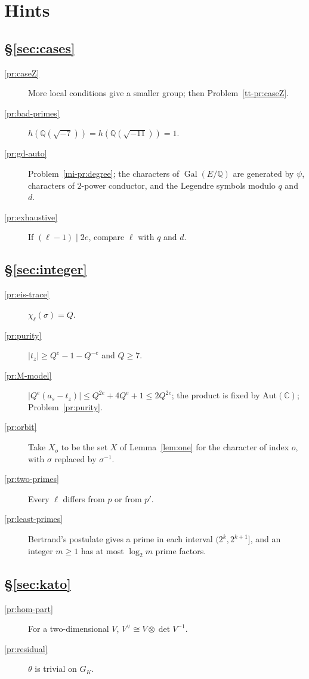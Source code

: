 \documentclass[reqno]{amsart}
\theoremstyle{definition}
\theoremstyle{plain}
\theoremstyle{remark}
\newcommand{\Q}{\mathbb{Q}}
\newcommand{\C}{\mathbb{C}}
\newcommand{\Gal}{\operatorname{Gal}}
\begin{document}
\section*{Hints}

\subsection*{\S\ref{sec:cases}}
\begin{description}
\item[\ref{pr:caseZ}] More local conditions give a smaller group; then Problem~\ref{tt-pr:caseZ}.
\item[\ref{pr:bad-primes}] \(h(\Q(\sqrt{-7}))=h(\Q(\sqrt{-11}))=1\).
\item[\ref{pr:gd-auto}] Problem~\ref{mi-pr:degree}; the characters of \(\Gal(E/\Q)\) are generated by \(\psi\), characters of \(2\)-power conductor, and the Legendre symbols modulo \(q\) and \(d\).
\item[\ref{pr:exhaustive}] If \((\ell-1)\mid2e\), compare \(\ell\) with \(q\) and \(d\).
\end{description}

\subsection*{\S\ref{sec:integer}}
\begin{description}
\item[\ref{pr:eis-trace}] \(\chi_\ell(\sigma)=Q\).
\item[\ref{pr:purity}] \(\lvert t_z\rvert\ge Q^e-1-Q^{-e}\) and \(Q\ge7\).
\item[\ref{pr:M-model}] \(\lvert Q^e(a_s-t_z)\rvert\le Q^{2e}+4Q^e+1\le2Q^{2e}\); the product is fixed by \(\mathrm{Aut}(\C)\); Problem~\ref{pr:purity}.
\item[\ref{pr:orbit}] Take \(X_o\) to be the set \(X\) of Lemma~\ref{lem:one} for the character of index \(o\), with \(\sigma\) replaced by \(\sigma^{-1}\).
\item[\ref{pr:two-primes}] Every \(\ell\) differs from \(p\) or from \(p'\).
\item[\ref{pr:least-primes}] Bertrand's postulate gives a prime in each interval \((2^k,2^{k+1}]\), and an integer \(m\ge1\) has at most \(\log_2m\) prime factors.
\end{description}

\subsection*{\S\ref{sec:kato}}
\begin{description}
\item[\ref{pr:hom-part}] For a two-dimensional \(V\), \(V^\vee\cong V\otimes\det V^{-1}\).
\item[\ref{pr:residual}] \(\theta\) is trivial on \(G_K\).
\end{description}
\end{document}
